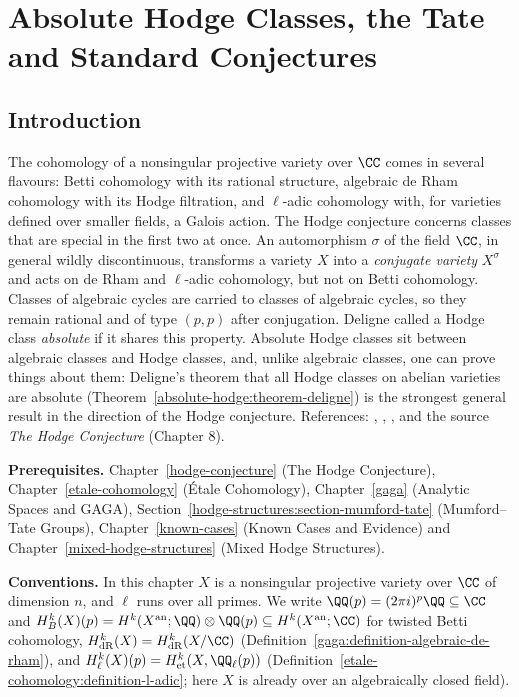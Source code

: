\chapter{Absolute Hodge Classes, the Tate and Standard Conjectures}\label{absolute-hodge}

\section{Introduction}\label{absolute-hodge:section-introduction}

The cohomology of a nonsingular projective variety over $\CC$ comes in several flavours: Betti cohomology with its rational structure, algebraic de Rham cohomology with its Hodge filtration, and
$\ell$-adic cohomology with, for varieties defined over smaller fields, a Galois action. The Hodge conjecture concerns classes that are special in the first two at once. An automorphism
$\sigma$ of the field $\CC$, in general wildly discontinuous, transforms a variety $X$ into a \emph{conjugate variety} $X^\sigma$ and acts on de Rham and $\ell$-adic cohomology, but not on Betti
cohomology. Classes of algebraic cycles are carried to classes of algebraic cycles, so they remain rational and of type $(p,p)$ after conjugation. Deligne called a Hodge class \emph{absolute} if it
shares this property. Absolute Hodge classes sit between algebraic classes and Hodge classes, and, unlike algebraic classes, one can prove things about them: Deligne's
theorem that all Hodge classes on abelian varieties are absolute (Theorem~\ref{absolute-hodge:theorem-deligne}) is the strongest general result in the direction of the Hodge conjecture.
References: \cite{deligne-abelian}, \cite{charles-schnell}, \cite{voisin-2007}, and the source \emph{The Hodge Conjecture} (Chapter 8).

\noindent\textbf{Prerequisites.} Chapter~\ref{hodge-conjecture} (The Hodge Conjecture), Chapter~\ref{etale-cohomology} (\'Etale Cohomology), Chapter~\ref{gaga} (Analytic Spaces and GAGA),
Section~\ref{hodge-structures:section-mumford-tate} (Mumford--Tate Groups), Chapter~\ref{known-cases} (Known Cases and Evidence) and Chapter~\ref{mixed-hodge-structures} (Mixed Hodge Structures).

\noindent\textbf{Conventions.} In this chapter $X$ is a nonsingular projective variety over $\CC$ of dimension $n$, and $\ell$ runs over all primes. We write
$\QQ(p) = (2\pi i)^p\QQ \subseteq \CC$ and $H^k_B(X)(p) = H^k(X^{\mathrm{an}}; \QQ) \otimes \QQ(p) \subseteq H^k(X^{\mathrm{an}}; \CC)$ for twisted Betti cohomology, $H^k_{\mathrm{dR}}(X) = H^k_{\mathrm{dR}}(X/\CC)$
(Definition~\ref{gaga:definition-algebraic-de-rham}), and $H^k_\ell(X)(p) = H^k_{\mathrm{et}}(X, \QQ_\ell(p))$ (Definition~\ref{etale-cohomology:definition-l-adic}; here $X$ is already over an algebraically
closed field).

